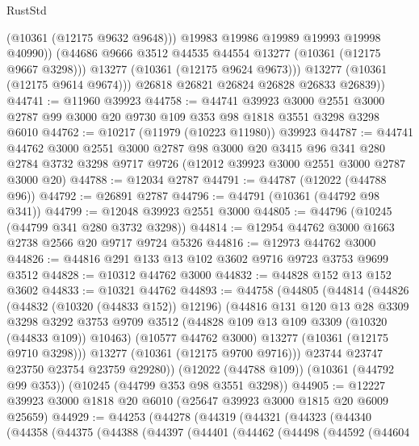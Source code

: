 \begin{lexlean}{RustStd}
\begin{coremodule}
                  (@10361 (@12175 @9632 @9648)))
                @19983
                @19986
                @19989
                @19993
                @19998
                @40990))
            (@44686 @9666 @3512 @44535 @44554 @13277 (@10361 (@12175 @9667 @3298)))
            @13277
            (@10361 (@12175 @9624 @9673)))
          @13277
          (@10361 (@12175 @9614 @9674)))
        @26818
        @26821
        @26824
        @26828
        @26833
        @26839))
@44741 := @11960 @39923
@44758 := @44741
    @39923
    @3000
    @2551
    @3000
    @2787
    @99
    @3000
    @20
    @9730
    @109
    @353
    @98
    @1818
    @3551
    @3298
    @3298
    @6010
@44762 := @10217 (@11979 (@10223 @11980)) @39923
@44787 := @44741
    @44762
    @3000
    @2551
    @3000
    @2787
    @98
    @3000
    @20
    @3415
    @96
    @341
    @280
    @2784
    @3732
    @3298
    @9717
    @9726
    (@12012 @39923 @3000 @2551 @3000 @2787 @3000 @20)
@44788 := @12034 @2787
@44791 := @44787 (@12022 (@44788 @96))
@44792 := @26891 @2787
@44796 := @44791 (@10361 (@44792 @98 @341))
@44799 := @12048 @39923 @2551 @3000
@44805 := @44796 (@10245 (@44799 @341 @280 @3732 @3298))
@44814 := @12954 @44762 @3000 @1663 @2738 @2566 @20 @9717 @9724 @5326
@44816 := @12973 @44762 @3000
@44826 := @44816 @291 @133 @13 @102 @3602 @9716 @9723 @3753 @9699 @3512
@44828 := @10312 @44762 @3000
@44832 := @44828 @152 @13 @152 @3602
@44833 := @10321 @44762
@44893 := @44758
    (@44805
      (@44814
        (@44826
          (@44832 (@10320 (@44833 @152)) @12196)
          (@44816
            @131
            @120
            @13
            @28
            @3309
            @3298
            @3292
            @3753
            @9709
            @3512
            (@44828 @109 @13 @109 @3309 (@10320 (@44833 @109)) @10463)
            (@10577 @44762 @3000)
            @13277
            (@10361 (@12175 @9710 @3298)))
          @13277
          (@10361 (@12175 @9700 @9716)))
        @23744
        @23747
        @23750
        @23754
        @23759
        @29280))
    (@12022 (@44788 @109))
    (@10361 (@44792 @99 @353))
    (@10245 (@44799 @353 @98 @3551 @3298))
@44905 := @12227 @39923 @3000 @1818 @20 @6010 (@25647 @39923 @3000 @1815 @20 @6009 @25659)
@44929 := @44253
    (@44278
      (@44319
        (@44321
          (@44323
            (@44340
              (@44358
                (@44375
                  (@44388
                    (@44397
                      (@44401
                        (@44462
                          (@44498
                            (@44592
                              (@44604

\end{coremodule}
\end{lexlean}
